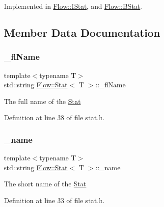 Implemented in \hyperlink{class_flow_1_1_i_stat_a14a9ee1f7703cf474a12d07f334ab4a3}{Flow\+::\+I\+Stat}, and \hyperlink{class_flow_1_1_b_stat_aafd9dbf4e02e6fbfc3bc3dfb572496dc}{Flow\+::\+B\+Stat}.



\subsection{Member Data Documentation}
\hypertarget{class_flow_1_1_stat_a6e6f57fcab4840d6ed92639f017b8e0c}{}\label{class_flow_1_1_stat_a6e6f57fcab4840d6ed92639f017b8e0c} 
\subsubsection{\texorpdfstring{\+\_\+fl\+Name}{\_flName}}
{\footnotesize\ttfamily template$<$typename T$>$ \\
std\+::string \hyperlink{class_flow_1_1_stat}{Flow\+::\+Stat}$<$ T $>$\+::\+\_\+fl\+Name\hspace{0.3cm}{\ttfamily [protected]}}

The full name of the \hyperlink{class_flow_1_1_stat}{Stat} 

Definition at line 38 of file stat.\+h.

\hypertarget{class_flow_1_1_stat_ad85647ec1e66fd927a9e15755fc9f3c1}{}\label{class_flow_1_1_stat_ad85647ec1e66fd927a9e15755fc9f3c1} 
\subsubsection{\texorpdfstring{\+\_\+name}{\_name}}
{\footnotesize\ttfamily template$<$typename T$>$ \\
std\+::string \hyperlink{class_flow_1_1_stat}{Flow\+::\+Stat}$<$ T $>$\+::\+\_\+name\hspace{0.3cm}{\ttfamily [protected]}}

The short name of the \hyperlink{class_flow_1_1_stat}{Stat} 

Definition at line 33 of file stat.\+h.

\hypertarget{class_flow_1_1_stat_aba908d9094479b62f72a9663ba25232b}{}\label{class_flow_1_1_stat_aba908d9094479b62f72a9663ba25232b} 
